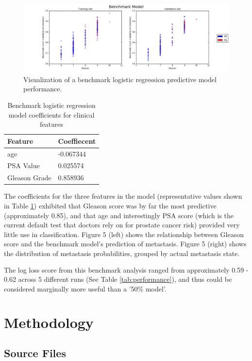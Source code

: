 \documentclass[final]{article}
\begin{document}
\begin{figure}[h]
  \centering
  \includegraphics[width=\textwidth]{benchmark}
  \caption{Visualization of a benchmark logistic regression predictive model performance.\label{fig:benchScat}}
\end{figure}

\begin{table}
  \centering
  \caption{\label{tab:benchcoefs} Benchmark logistic regression model coefficients for clinical features}
    \begin{tabular}{l l}
      \hline
      Feature & Coeffiecent \\  \hline
      age & -0.067344 \\
      PSA Value & 0.025574 \\
      Gleason Grade & 0.858936 \\
      \hline
    \end{tabular}
  \end{table}

The coefficients for the three features in the model (representative values shown in Table \ref{tab:benchcoefs}) exhibited that
Gleason score was by far the most predictive (approximately 0.85), and that age and
interestingly PSA score (which is the current default test that doctors rely on
for prostate cancer risk)  provided very little use in classification.  Figure 5
(left) shows the relationship between Gleason score and the benchmark model's
prediction of metastasis.  Figure 5 (right) shows the distribution of metastasis
probabilities, grouped by actual metastasis state.

The log loss score from this benchmark analysis ranged from approximately 0.59 - 0.62 across 5 different runs (See Table \ref{tab:performance}), and
thus could be considered marginally more useful than a '50\% model'.

\section{Methodology}

\subsection{Source Files}
\end{document}
